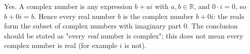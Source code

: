 Yes. A complex number is any expression $b+ai$ with $a,b\in\mathbb R$, and $0\cdot i=0$, so $b+0i=b$. Hence every real number $b$ is the complex number $b+0i$: the reals form the subset of complex numbers with imaginary part $0$. The conclusion should be stated as "every \emph{real} number is complex"; this does not mean every complex number is real (for example $i$ is not).
